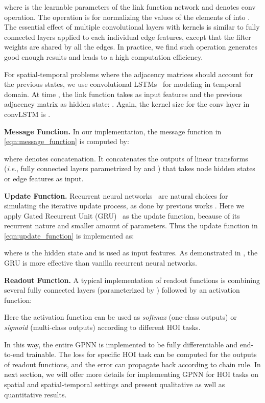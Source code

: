 \documentclass[runningheads]{llncs}
\newcommand{\ie}{\textit{i}.\textit{e}.}
\begin{document}
where  is the learnable parameters of the link function network  and  denotes conv operation. The  operation  is for normalizing the values of the elements of  into . The essential effect of multiple convolutional layers with  kernels is similar to fully connected layers applied to each individual edge features, except that the filter weights are shared by all the edges. In practice, we find such operation generates good enough results and leads to a high computation efficiency.




For spatial-temporal problems where the adjacency matrices should account for the previous states, we use convolutional LSTMs~\cite{xingjian2015convolutional} for modeling  in temporal domain. At time , the link function takes  as input features and the previous adjacency matrix  as hidden state: .
Again, the kernel size for the conv layer in convLSTM is .

\noindent\textbf{Message Function.}
In our implementation, the message function  in \autoref{eqn:message_function} is computed by:

where  denotes concatenation. It concatenates the outputs of linear transforms (\ie, fully connected layers parametrized by  and ) that takes node hidden states  or edge features  as input. 

\noindent\textbf{Update Function.} Recurrent neural networks~\cite{elman1990finding,hochreiter1997long} are natural choices for simulating the iterative update process, as done by previous works \cite{gilmer2017neural}. Here we apply Gated Recurrent Unit (GRU)~\cite{cho2014properties} as the update function, because of its recurrent nature and smaller amount of parameters. Thus the update function in \autoref{eqn:update_function} is implemented as:

where  is the hidden state and  is used as input features. As demonstrated in \cite{li2015gated}, the GRU is more effective than vanilla recurrent neural networks.


\noindent\textbf{Readout Function.}
A typical implementation of readout functions is combining several fully connected layers (parameterized by ) followed by an activation function:

Here the activation function  can be used as \textit{softmax} (one-class outputs) or \textit{sigmoid} (multi-class outputs) according to different HOI tasks.

In this way, the entire GPNN is implemented to be fully differentiable and end-to-end trainable. The loss for specific HOI task can be computed for the outputs of readout functions, and the error can propagate back according to chain rule. In next section, we will offer more details for implementing GPNN for HOI tasks on spatial and spatial-temporal settings and present qualitative as well as quantitative results.
\end{document}
